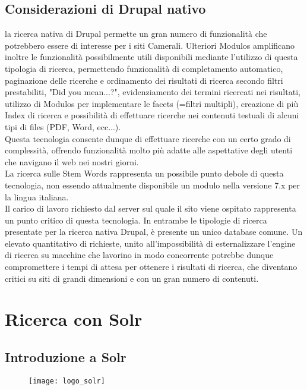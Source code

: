 		\subsection{Considerazioni di Drupal nativo}
		la ricerca nativa di \gls{Drupal} permette un gran numero di funzionalità che potrebbero essere di interesse per i siti Camerali. Ulteriori \glspl{Modulo} amplificano inoltre le funzionalità possibilmente utili disponibili mediante l'utilizzo di questa tipologia di ricerca, permettendo funzionalità di completamento automatico, paginazione delle ricerche e ordinamento dei risultati di ricerca secondo filtri prestabiliti, "Did you mean...?", evidenziamento dei termini ricercati nei risultati, utilizzo di \glspl{Modulo} per implementare le facets (=filtri multipli), creazione di più \gls{Index} di ricerca e possibilità di effettuare ricerche nei contenuti testuali di alcuni tipi di files (PDF, Word, ecc...). \\
		Questa tecnologia consente dunque di effettuare ricerche con un certo grado di complessità, offrendo funzionalità molto più adatte alle aspettative degli utenti che navigano il web nei nostri giorni. \\
		La ricerca sulle \gls{Stem Words} rappresenta un possibile punto debole di questa tecnologia, non essendo attualmente disponibile un modulo nella versione 7.x per la lingua italiana.\\
		Il carico di lavoro richiesto dal server sul quale il sito viene ospitato rappresenta un punto critico di questa tecnologia. In entrambe le tipologie di ricerca presentate per la ricerca nativa \gls{Drupal}, è presente un unico database comune. Un elevato quantitativo di richieste, unito all'impossibilità di esternalizzare l'engine di ricerca su macchine che lavorino in modo concorrente potrebbe dunque compromettere i tempi di attesa per ottenere i risultati di ricerca, che diventano critici su siti di grandi dimensioni e con un gran numero di contenuti.

	\section{Ricerca con Solr}

		\subsection{Introduzione a Solr}
		
		\begin{figure}[htbp]
			\begin{center}
				\texttt{[image: logo\_solr]}
			\end{center}
		\end{figure}
	
